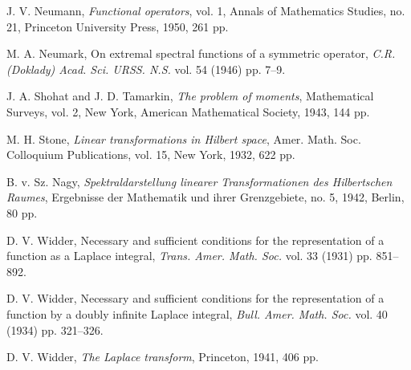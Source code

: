 \documentclass{article}
\begin{document}
\begin{thebibliography}{99}
 J. V. Neumann, \emph{Functional operators}, vol. 1, Annals of Mathematics Studies, no. 21, Princeton University Press, 1950, 261 pp.

 M. A. Neumark, On extremal spectral functions of a symmetric operator, \emph{C.R. (Doklady) Acad. Sci. URSS. N.S.} vol. 54 (1946) pp. 7--9.

 J. A. Shohat and J. D. Tamarkin, \emph{The problem of moments}, Mathematical Surveys, vol. 2, New York, American Mathematical Society, 1943, 144 pp.

 M. H. Stone, \emph{Linear transformations in Hilbert space}, Amer. Math. Soc. Colloquium Publications, vol. 15, New York, 1932, 622 pp.

 B. v. Sz. Nagy, \emph{Spektraldarstellung linearer Transformationen des Hilbertschen Raumes}, Ergebnisse der Mathematik und ihrer Grenzgebiete, no. 5, 1942, Berlin, 80 pp.

 D. V. Widder, Necessary and sufficient conditions for the representation of a function as a Laplace integral, \emph{Trans. Amer. Math. Soc.} vol. 33 (1931) pp. 851--892.

 D. V. Widder, Necessary and sufficient conditions for the representation of a function by a doubly infinite Laplace integral, \emph{Bull. Amer. Math. Soc.} vol. 40 (1934) pp. 321--326.

 D. V. Widder, \emph{The Laplace transform}, Princeton, 1941, 406 pp.

\end{thebibliography}
\end{document}
